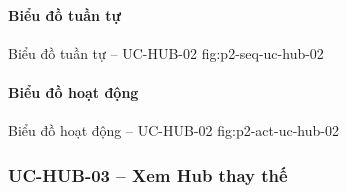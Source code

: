 \clearpage
\paragraph{Biểu đồ tuần tự}
  {Biểu đồ tuần tự -- UC-HUB-02}
  {fig:p2-seq-uc-hub-02}

\clearpage
\paragraph{Biểu đồ hoạt động}
  {Biểu đồ hoạt động -- UC-HUB-02}
  {fig:p2-act-uc-hub-02}

\clearpage

\subsubsection{UC-HUB-03 -- Xem Hub thay thế}


